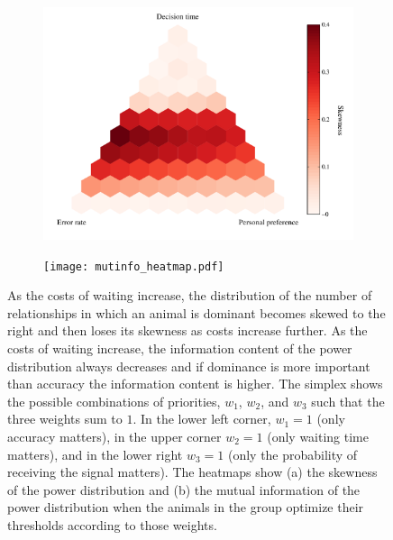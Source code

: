 \documentclass{article}
\begin{document}
\begin{figure}
\begin{subfigure}{3.415in}
\caption{}
\includegraphics[width=\textwidth]{skewness_heatmap.pdf}
\end{subfigure}
\begin{subfigure}{3.415in}
\caption{}
\texttt{[image: mutinfo\_heatmap.pdf]}
\end{subfigure}
\caption{\label{power} As the costs of waiting increase, the distribution of the number of relationships in which an animal is dominant becomes skewed to the right and then loses its skewness as costs increase further.  As the costs of waiting increase, the information content of the power distribution always decreases and if dominance is more important than accuracy the information content is higher.  The simplex shows the possible combinations of priorities, $w_1$, $w_2$, and $w_3$ such that the three weights sum to $1$.  In the lower left corner, $w_1=1$ (only accuracy matters), in the upper corner $w_2=1$ (only waiting time matters), and in the lower right $w_3=1$ (only the probability of receiving the signal matters).  The heatmaps show (a) the skewness of the power distribution and (b) the mutual information of the power distribution when the animals in the group optimize their thresholds according to those weights.  
}
\end{figure}
\end{document}
